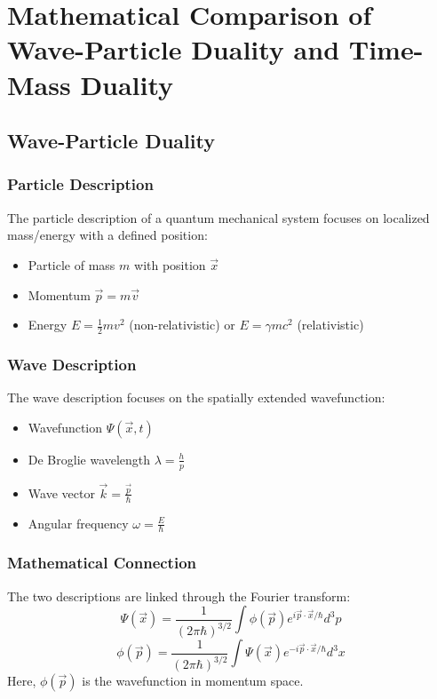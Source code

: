 \documentclass[a4paper,12pt]{article}
\begin{document}
	\section{Mathematical Comparison of Wave-Particle Duality and Time-Mass Duality}
	
	\subsection{Wave-Particle Duality}
	
	\subsubsection{Particle Description}
	The particle description of a quantum mechanical system focuses on localized mass/energy with a defined position:
	\begin{itemize}
		\item Particle of mass \( m \) with position \( \vec{x} \)
		\item Momentum \( \vec{p} = m\vec{v} \)
		\item Energy \( E = \frac{1}{2}mv^2 \) (non-relativistic) or \( E = \gamma mc^2 \) (relativistic)
	\end{itemize}
	
	\subsubsection{Wave Description}
	The wave description focuses on the spatially extended wavefunction:
	\begin{itemize}
		\item Wavefunction \( \Psi(\vec{x},t) \)
		\item De Broglie wavelength \( \lambda = \frac{h}{p} \)
		\item Wave vector \( \vec{k} = \frac{\vec{p}}{\hbar} \)
		\item Angular frequency \( \omega = \frac{E}{\hbar} \)
	\end{itemize}
	
	\subsubsection{Mathematical Connection}
	The two descriptions are linked through the Fourier transform:
	\[
	\Psi(\vec{x}) = \frac{1}{(2\pi\hbar)^{3/2}} \int \phi(\vec{p}) e^{i\vec{p}\cdot\vec{x}/\hbar} d^3p
	\]
	\[
	\phi(\vec{p}) = \frac{1}{(2\pi\hbar)^{3/2}} \int \Psi(\vec{x}) e^{-i\vec{p}\cdot\vec{x}/\hbar} d^3x
	\]
	Here, \( \phi(\vec{p}) \) is the wavefunction in momentum space.
	
\end{document}
